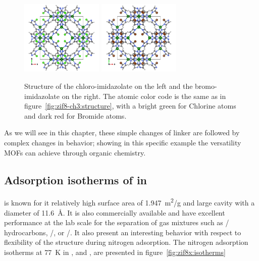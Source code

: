 \documentclass[thesis]{subfiles}
\begin{document}
\begin{figure}[ht]
    \centering
    \includegraphics[width=0.35\textwidth]{figures/images/ZIF8-Cl}
    \hspace{2em}
    \includegraphics[width=0.35\textwidth]{figures/images/ZIF8-Br}
    \caption{Structure of the chloro-imidazolate \ZIFCl on the left and the
    bromo-imidazolate \ZIFBr on the right. The atomic color code is the same
    as in figure~\ref{fig:zif8-ch3:structure}, with a bright green for Chlorine
    atoms and dark red for Bromide atoms.}
    \label{fig:zif8-x:structures}
\end{figure}

As we will see in this chapter, these simple changes of linker are followed by
complex changes in behavior; showing in this specific example the versatility
MOFs can achieve through organic chemistry.

\FloatBarrier
\subsection{Adsorption isotherms of  in }

 is known for it relatively high surface area of \SI{1.947}{m^2/g} and
large cavity with a diameter of \SI{11.6}{\AA}\cite{Park2006}. It is also
commercially available and have excellent performance at the lab scale for the
separation of gas mixtures such as / hydrocarbons,
/, or /\cite{Li2009,Bux2011}. It also present an
interesting behavior with respect to flexibility of the structure during
nitrogen adsorption. The nitrogen adsorption isotherms at \SI{77}{K} in ,
\ZIFCl and \ZIFBr, are presented in figure~\ref{fig:zif8x:isotherms}
\end{document}
